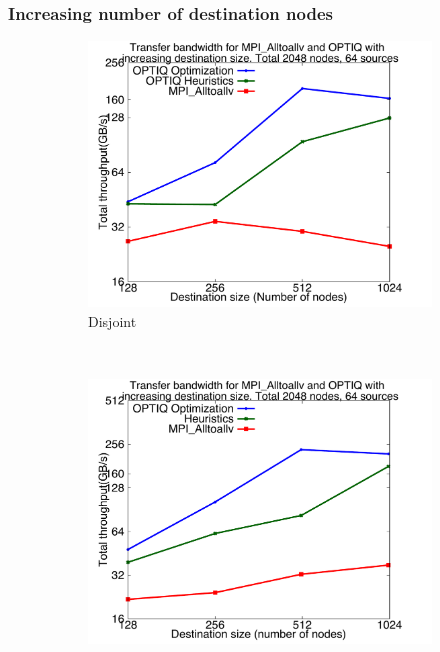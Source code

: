 \subsubsection{Increasing number of destination nodes}
\label{sec:incrdestnodes}

\begin{figure}%
        \centering
        \begin{subfigure}[b]{0.32\textwidth}
                \includegraphics[width=\textwidth]{figures/incrsize_disjoint.pdf}
                \caption{Disjoint}
                \label{fig:incrsize_disjoint}
        \end{subfigure}%
        ~ %
        \begin{subfigure}[b]{0.32\textwidth}
                \includegraphics[width=\textwidth]{figures/incrsize_overlap}

\end{subfigure}
\end{figure}
